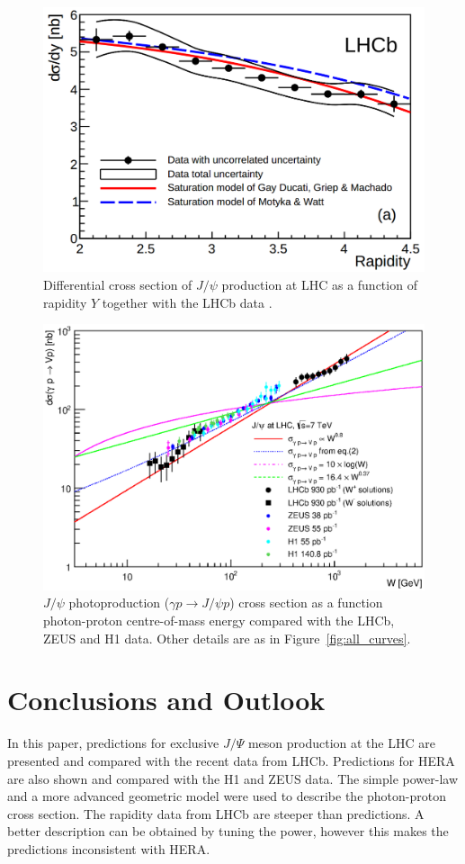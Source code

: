 \documentclass[12pt]{article}
\begin{document}
\begin{figure}[p]
\centering
 \includegraphics[width=.8\textwidth]{figures/Magno.png}
 \caption{Differential cross section of $J/\psi$ production at LHC as a function of rapidity $Y$ together with the LHCb data \cite{LHCb2}.}
 \label{fig:dipole}
\end{figure}

\clearpage

\begin{figure}[!t]
\centering
 \includegraphics[width=.8\textwidth]{figures/sigma_gamma_p_W_all_theory.eps}
 \caption{$J/\psi$ photoproduction ($\gamma p \to J/\psi p$) cross section as a function photon-proton centre-of-mass energy compared
           with the LHCb, ZEUS and H1 data. Other details are as in Figure~\ref{fig:all_curves}.}
 \label{fig:all_curves_w}
\end{figure}

\section{Conclusions and Outlook}

In this paper, predictions for exclusive $J/\Psi$ meson production at the LHC are presented and compared with the recent data from LHCb.
Predictions for HERA are also shown and compared with the H1 and ZEUS data.
The simple power-law and a more advanced geometric model were used to describe the photon-proton cross section.
The rapidity data from LHCb are steeper than predictions. A better description can be obtained by tuning the power,
however this makes the predictions inconsistent with HERA. 
\end{document}
